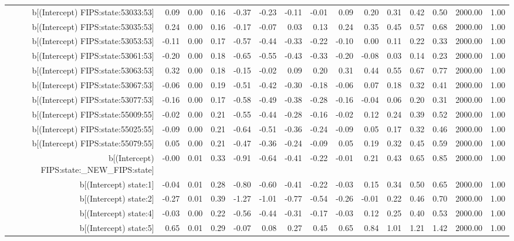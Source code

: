 \begin{table}[ht]
\begin{tabular}{rrrrrrrrrrrrrrr}
  b[(Intercept) FIPS:state:53033:53] & 0.09 & 0.00 & 0.16 & -0.37 & -0.23 & -0.11 & -0.01 & 0.09 & 0.20 & 0.31 & 0.42 & 0.50 & 2000.00 & 1.00 \\ 
  b[(Intercept) FIPS:state:53035:53] & 0.24 & 0.00 & 0.16 & -0.17 & -0.07 & 0.03 & 0.13 & 0.24 & 0.35 & 0.45 & 0.57 & 0.68 & 2000.00 & 1.00 \\ 
  b[(Intercept) FIPS:state:53053:53] & -0.11 & 0.00 & 0.17 & -0.57 & -0.44 & -0.33 & -0.22 & -0.10 & 0.00 & 0.11 & 0.22 & 0.33 & 2000.00 & 1.00 \\ 
  b[(Intercept) FIPS:state:53061:53] & -0.20 & 0.00 & 0.18 & -0.65 & -0.55 & -0.43 & -0.33 & -0.20 & -0.08 & 0.03 & 0.14 & 0.23 & 2000.00 & 1.00 \\ 
  b[(Intercept) FIPS:state:53063:53] & 0.32 & 0.00 & 0.18 & -0.15 & -0.02 & 0.09 & 0.20 & 0.31 & 0.44 & 0.55 & 0.67 & 0.77 & 2000.00 & 1.00 \\ 
  b[(Intercept) FIPS:state:53067:53] & -0.06 & 0.00 & 0.19 & -0.51 & -0.42 & -0.30 & -0.18 & -0.06 & 0.07 & 0.18 & 0.32 & 0.41 & 2000.00 & 1.00 \\ 
  b[(Intercept) FIPS:state:53077:53] & -0.16 & 0.00 & 0.17 & -0.58 & -0.49 & -0.38 & -0.28 & -0.16 & -0.04 & 0.06 & 0.20 & 0.31 & 2000.00 & 1.00 \\ 
  b[(Intercept) FIPS:state:55009:55] & -0.02 & 0.00 & 0.21 & -0.55 & -0.44 & -0.28 & -0.16 & -0.02 & 0.12 & 0.24 & 0.39 & 0.52 & 2000.00 & 1.00 \\ 
  b[(Intercept) FIPS:state:55025:55] & -0.09 & 0.00 & 0.21 & -0.64 & -0.51 & -0.36 & -0.24 & -0.09 & 0.05 & 0.17 & 0.32 & 0.46 & 2000.00 & 1.00 \\ 
  b[(Intercept) FIPS:state:55079:55] & 0.05 & 0.00 & 0.21 & -0.47 & -0.36 & -0.24 & -0.09 & 0.05 & 0.19 & 0.32 & 0.45 & 0.59 & 2000.00 & 1.00 \\ 
  b[(Intercept) FIPS:state:\_NEW\_FIPS:state] & -0.00 & 0.01 & 0.33 & -0.91 & -0.64 & -0.41 & -0.22 & -0.01 & 0.21 & 0.43 & 0.65 & 0.85 & 2000.00 & 1.00 \\ 
  b[(Intercept) state:1] & -0.04 & 0.01 & 0.28 & -0.80 & -0.60 & -0.41 & -0.22 & -0.03 & 0.15 & 0.34 & 0.50 & 0.65 & 2000.00 & 1.00 \\ 
  b[(Intercept) state:2] & -0.27 & 0.01 & 0.39 & -1.27 & -1.01 & -0.77 & -0.54 & -0.26 & -0.01 & 0.22 & 0.46 & 0.70 & 2000.00 & 1.00 \\ 
  b[(Intercept) state:4] & -0.03 & 0.00 & 0.22 & -0.56 & -0.44 & -0.31 & -0.17 & -0.03 & 0.12 & 0.25 & 0.40 & 0.53 & 2000.00 & 1.00 \\ 
  b[(Intercept) state:5] & 0.65 & 0.01 & 0.29 & -0.07 & 0.08 & 0.27 & 0.45 & 0.65 & 0.84 & 1.01 & 1.21 & 1.42 & 2000.00 & 1.00 \\ 

\end{tabular}
\end{table}
